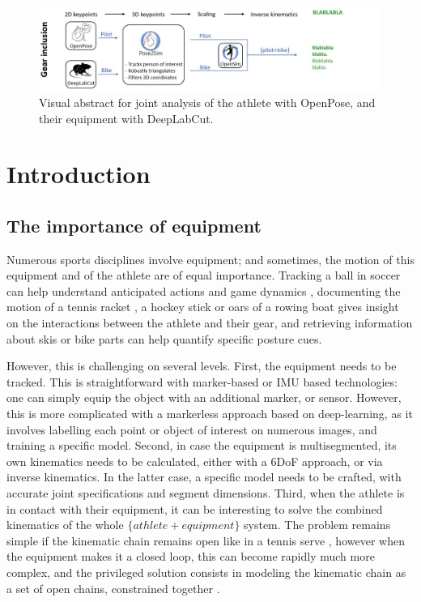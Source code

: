 \newpage

\minitoc

\vspace*{3cm}

\begin{figure}[hbtp]
	\centering
	\def\svgwidth{1\columnwidth}
	\fontsize{10pt}{10pt}\selectfont
	\includegraphics[width=\linewidth]{"../Intro/Figures/Fig_VisAbstract5.JPG"}
      \caption{Visual abstract for joint analysis of the athlete with OpenPose, and their equipment with DeepLabCut.}
	\label{fig_visabstract5}
\end{figure}

\newpage


\section{Introduction}
\subsection{The importance of equipment}

Numerous sports disciplines involve equipment; and sometimes, the motion of this equipment and of the athlete are of equal importance. Tracking a ball in soccer can help understand anticipated actions and game dynamics \cite{Ghasemzadeh2021}, documenting the motion of a tennis racket \cite{Martin2013}, a hockey stick \cite{Kays2017} or oars of a rowing boat \cite{Ruffaldi2015} gives insight on the interactions between the athlete and their gear, and retrieving information about skis \cite{Ludwig2020} or bike parts \cite{Rosenhahn2008} can help quantify specific posture cues.

However, this is challenging on several levels. First, the equipment needs to be tracked. This is straightforward with marker-based or IMU based technologies: one can simply equip the object with an additional marker, or sensor. However, this is more complicated with a markerless approach based on deep-learning, as it involves labelling each point or object of interest on numerous images, and training a specific model. Second, in case the equipment is multisegmented, its own kinematics needs to be calculated, either with a 6DoF approach, or via inverse kinematics. In the latter case, a specific model needs to be crafted, with accurate joint specifications and segment dimensions. Third, when the athlete is in contact with their equipment, it can be interesting to solve the combined kinematics of the whole $\{athlete+equipment\}$ system. The problem remains simple if the kinematic chain remains open like in a tennis serve \cite{Martin2013}, however when the equipment makes it a closed loop, this can become rapidly much more complex, and the privileged solution consists in modeling the kinematic chain as a set of open chains, constrained together \cite{Rosenhahn2008}. 

